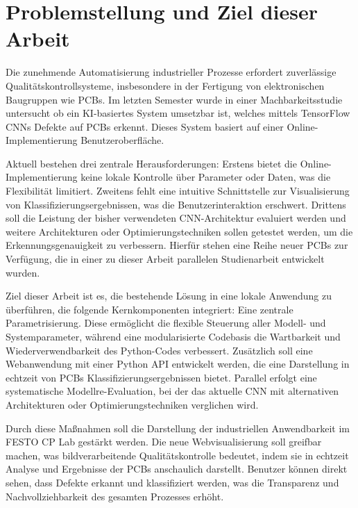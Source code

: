 \chapter{Problemstellung und Ziel dieser Arbeit} \label{chap:problemstellung_und_ziel_dieser_arbeit}

Die zunehmende Automatisierung industrieller Prozesse erfordert zuverlässige Qualitätskontrollsysteme, insbesondere in der Fertigung von elektronischen Baugruppen wie \acp{PCB}. Im letzten Semester wurde in einer Machbarkeitsstudie untersucht ob ein KI-basiertes System umsetzbar ist, welches mittels TensorFlow \acp{CNN} 
Defekte auf \acp{PCB} erkennt. Dieses System basiert auf einer Online-Implementierung Benutzeroberfläche. 

Aktuell bestehen drei zentrale Herausforderungen: Erstens bietet die Online- Implementierung keine lokale Kontrolle über Parameter oder Daten, was die Flexibilität limitiert. Zweitens fehlt eine intuitive Schnittstelle zur Visualisierung von 
Klassifizierungsergebnissen, was die Benutzerinteraktion erschwert. Drittens soll die Leistung der bisher verwendeten \ac{CNN}-Architektur evaluiert werden und weitere Architekturen oder Optimierungstechniken sollen getestet werden, um die
Erkennungsgenauigkeit zu verbessern. Hierfür stehen eine Reihe neuer \ac{PCB}s zur Verfügung, die in einer zu dieser Arbeit parallelen Studienarbeit entwickelt wurden.

Ziel dieser Arbeit ist es, die bestehende Lösung in eine lokale Anwendung zu überführen, die folgende Kernkomponenten integriert: Eine zentrale Parametrisierung. Diese ermöglicht die flexible Steuerung aller Modell- und Systemparameter, während eine 
modularisierte Codebasis die Wartbarkeit und Wiederverwendbarkeit des Python-Codes verbessert. Zusätzlich soll eine Webanwendung mit einer Python \ac{API} entwickelt werden, die eine Darstellung in echtzeit von \acp{PCB} Klassifizierungsergebnissen bietet. 
Parallel erfolgt eine systematische Modellre-Evaluation, bei der das aktuelle \ac{CNN} mit alternativen Architekturen oder Optimierungstechniken verglichen wird.

Durch diese Maßnahmen soll die Darstellung der industriellen Anwendbarkeit im FESTO CP Lab gestärkt werden. 
Die neue Webvisualisierung soll greifbar machen, was bildverarbeitende Qualitätskontrolle bedeutet, indem sie in echtzeit Analyse und Ergebnisse der \acp{PCB} anschaulich darstellt. Benutzer können direkt sehen, dass Defekte erkannt und klassifiziert werden, was die Transparenz und Nachvollziehbarkeit des gesamten Prozesses erhöht.